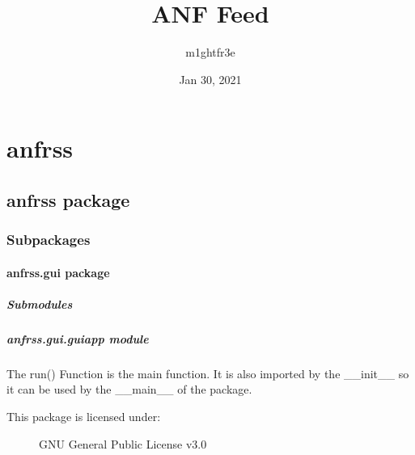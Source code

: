 \documentclass[letterpaper,10pt,english]{sphinxmanual}
\title{ANF Feed}
\date{Jan 30, 2021}
\author{m1ghtfr3e}
\begin{document}
\pagestyle{empty}
\sphinxmaketitle
\pagestyle{plain}
\sphinxtableofcontents
\pagestyle{normal}
\label{\detokenize{index::doc}}



\chapter{anfrss}
\label{\detokenize{modules:anfrss}}\label{\detokenize{modules::doc}}

\section{anfrss package}
\label{\detokenize{anfrss:anfrss-package}}\label{\detokenize{anfrss::doc}}

\subsection{Subpackages}
\label{\detokenize{anfrss:subpackages}}

\subsubsection{anfrss.gui package}
\label{\detokenize{anfrss.gui:anfrss-gui-package}}\label{\detokenize{anfrss.gui::doc}}

\paragraph{Submodules}
\label{\detokenize{anfrss.gui:submodules}}

\paragraph{anfrss.gui.guiapp module}
\label{\detokenize{anfrss.gui:anfrss-gui-guiapp-module}}
The run() \sphinxhyphen{} Function is the main function.
It is also imported by the \_\_init\_\_ so
it can be used by the \_\_main\_\_ of the
package.
\begin{description}
\item[{This package is licensed under:}] \leavevmode
\textendash{} GNU General Public License v3.0 \textendash{}

\end{description}
\end{document}
